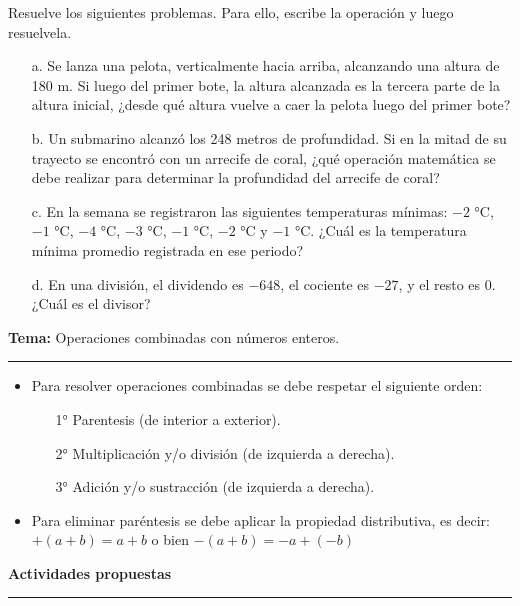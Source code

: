 \documentclass[spanish,letterpaper, 11pt, addpoints, answers]{exam}
\begin{document}
\begin{questions}
  \question Resuelve los siguientes problemas. Para ello, escribe la operación y luego resuelvela.
  
    \begin{itemize}
      \item[a.] Se lanza una pelota, verticalmente hacia arriba, alcanzando una altura de 180 m. Si luego del primer bote, la altura alcanzada es la tercera parte de la altura inicial, ¿desde qué altura vuelve a caer la pelota luego del primer bote?
      \item[b.] Un submarino alcanzó los 248 metros de profundidad. Si en la mitad de su trayecto se encontró con un arrecife de coral, ¿qué operación matemática se debe realizar para determinar la profundidad del arrecife de coral?
      \item[c.] En la semana se registraron las siguientes temperaturas mínimas: $-2$ °C, $-1$ °C, $-4$ °C, $-3$ °C, $-1$ °C, $-2$ °C y $-1$ °C. ¿Cuál es la temperatura mínima promedio registrada en ese periodo?
      \item[d.] En una división, el dividendo es $-648$, el cociente es $-27$, y el resto es $0$. ¿Cuál es el divisor?

    \end{itemize}
    
    \newpage
    \vspace{0.1in}
    \parbox{6in}{
    \textbf{Tema:} Operaciones combinadas con números enteros.}
    \vspace{0.15in}
    \hrule 
    
    \begin{itemize}
      \item Para resolver operaciones combinadas se debe respetar el siguiente orden:
      \begin{itemize}
        \item[1°] Parentesis (de interior a exterior).
        \item[2°] Multiplicación y/o división (de izquierda a derecha).
        \item[3°] Adición y/o sustracción (de izquierda a derecha).
      \end{itemize}
    
      \item Para eliminar paréntesis se debe aplicar la propiedad distributiva, es decir:
      $+(a+b)=a+b$ o bien $-(a+b)=-a+(-b)$
      
    \end{itemize}
    
    \parbox{6in}{
    \textbf{Actividades propuestas}}
    \vspace{0.15in}
    \hrule 
  

\end{questions}
\end{document}
